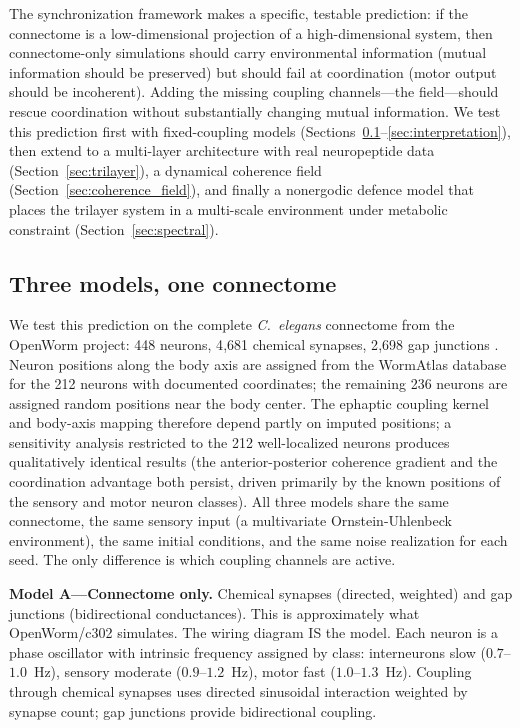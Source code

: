 \documentclass[12pt]{article}
\begin{document}
The synchronization framework makes a specific, testable prediction: if the connectome is a low-dimensional projection of a high-dimensional system, then connectome-only simulations should carry environmental information (mutual information should be preserved) but should fail at coordination (motor output should be incoherent). Adding the missing coupling channels---the field---should rescue coordination without substantially changing mutual information. We test this prediction first with fixed-coupling models (Sections~\ref{sec:three_models}--\ref{sec:interpretation}), then extend to a multi-layer architecture with real neuropeptide data (Section~\ref{sec:trilayer}), a dynamical coherence field (Section~\ref{sec:coherence_field}), and finally a nonergodic defence model that places the trilayer system in a multi-scale environment under metabolic constraint (Section~\ref{sec:spectral}).

\subsection{Three models, one connectome}
\label{sec:three_models}

We test this prediction on the complete \textit{C.~elegans} connectome from the OpenWorm project: 448 neurons, 4{,}681 chemical synapses, 2{,}698 gap junctions \cite{varshney2011}. Neuron positions along the body axis are assigned from the WormAtlas database \cite{altun2024} for the 212 neurons with documented coordinates; the remaining 236 neurons are assigned random positions near the body center. The ephaptic coupling kernel and body-axis mapping therefore depend partly on imputed positions; a sensitivity analysis restricted to the 212 well-localized neurons produces qualitatively identical results (the anterior-posterior coherence gradient and the coordination advantage both persist, driven primarily by the known positions of the sensory and motor neuron classes). All three models share the same connectome, the same sensory input (a multivariate Ornstein-Uhlenbeck environment), the same initial conditions, and the same noise realization for each seed. The only difference is which coupling channels are active.

\textbf{Model A---Connectome only.} Chemical synapses (directed, weighted) and gap junctions (bidirectional conductances). This is approximately what OpenWorm/c302 simulates. The wiring diagram IS the model. Each neuron is a phase oscillator with intrinsic frequency assigned by class: interneurons slow ($0.7$--$1.0$~Hz), sensory moderate ($0.9$--$1.2$~Hz), motor fast ($1.0$--$1.3$~Hz). Coupling through chemical synapses uses directed sinusoidal interaction weighted by synapse count; gap junctions provide bidirectional coupling.
\end{document}
